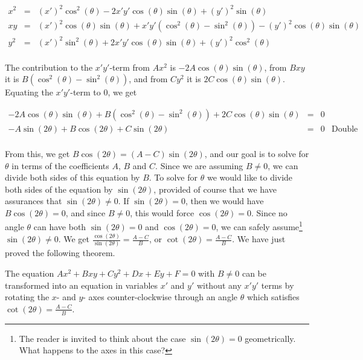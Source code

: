 \[ \begin{array}{rcl}



x^2 & = &(x')^2 \cos^{2}(\theta) - 2x'y'\cos(\theta) \sin(\theta) + (y')^2 \sin(\theta) \\ [3pt]


xy & = &  (x')^2\cos(\theta) \sin(\theta)+ x'y' \left(\cos^{2}(\theta)-\sin^2(\theta)\right)-(y')^2\cos(\theta)\sin(\theta) \\ [3pt]


y^2 & = & (x')^2 \sin^{2}(\theta) +2x'y' \cos(\theta) \sin(\theta) +(y')^2 \cos^{2}(\theta) \\

\end{array} \]

The contribution to the $x'y'$-term from $Ax^2$ is $-2A\cos(\theta) \sin(\theta)$, from $Bxy$ it is $B \left(\cos^{2}(\theta)-\sin^2(\theta)\right)$, and from $Cy^2$ it is $2C \cos(\theta) \sin(\theta)$.  Equating the $x'y'$-term to $0$, we get

\[ \begin{array}{rcll}

-2A\cos(\theta) \sin(\theta) + B \left(\cos^{2}(\theta)-\sin^2(\theta)\right) + 2C \cos(\theta) \sin(\theta) & = & 0 & \\ [3pt]
-A \sin(2\theta) + B \cos(2\theta) + C \sin(2\theta) & = & 0 & \text{Double Angle Identities} \\ [3pt]
\end{array} \]

From this, we get $B \cos(2\theta) = (A-C)\sin(2\theta)$, and our goal is to solve for $\theta$ in terms of the coefficients $A$, $B$ and $C$.  Since we are assuming $B \neq 0$, we can divide both sides of this equation by $B$.  To solve for $\theta$ we would like to divide both sides of the equation by $\sin(2\theta)$, provided of course that  we have assurances that $\sin(2\theta) \neq 0$.  If  $\sin(2\theta) = 0$, then we would have  $B \cos(2\theta) = 0$, and since $B \neq 0$, this would force $\cos(2\theta) = 0$.  Since no angle $\theta$ can have both $\sin(2\theta) = 0$ and $\cos(2\theta) = 0$, we can safely assume\footnote{The reader is invited to think about the case $\sin(2\theta) = 0$ geometrically.  What happens to the axes in this case?} $\sin(2\theta) \neq 0$.  We get $\frac{\cos(2\theta)}{\sin(2\theta)} = \frac{A-C}{B}$, or $\cot(2\theta) = \frac{A-C}{B}$.  We have just proved the following theorem.

\medskip
\colorbox{ResultColor}{\bbm

\begin{thm} \label{rotatedconicthm}  The equation  $Ax^2 + Bxy +Cy^2 + Dx + Ey + F = 0$ with $B \neq 0$ can be transformed into an equation in variables $x'$ and $y'$ without any $x'y'$ terms by rotating the $x$- and $y$- axes counter-clockwise through an angle $\theta$ which satisfies $\cot(2\theta) = \frac{A-C}{B}$.

\end{thm}

\ebm}
\medskip

